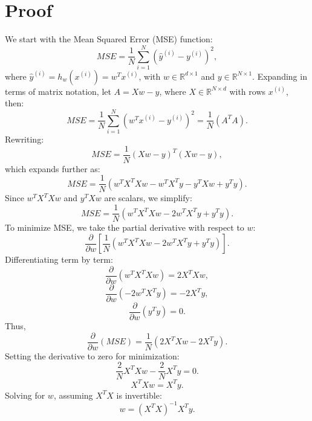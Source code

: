 \documentclass{article}
\begin{document}
\section*{Proof}
We start with the Mean Squared Error (MSE) function:
\begin{equation}
    MSE = \frac{1}{N} \sum_{i=1}^{N} (\hat{y}^{(i)} - y^{(i)})^2,
\end{equation}
where \( \hat{y}^{(i)} = h_w(x^{(i)}) = w^T x^{(i)} \), with \( w \in \mathbb{R}^{d \times 1} \) and \( y \in \mathbb{R}^{N \times 1} \).
Expanding in terms of matrix notation, let \( A = Xw - y \), where \( X \in \mathbb{R}^{N \times d} \) with rows \( x^{(i)} \), then:
\begin{equation}
    MSE = \frac{1}{N} \sum_{i=1}^{N} (w^T x^{(i)} - y^{(i)})^2 = \frac{1}{N} (A^T A).
\end{equation}
Rewriting:
\begin{equation}
    MSE = \frac{1}{N} (Xw - y)^T (Xw - y),
\end{equation}
which expands further as:
\begin{equation}
    MSE = \frac{1}{N} \left( w^T X^T X w - w^T X^T y - y^T X w + y^T y \right).
\end{equation}
Since \( w^T X^T X w \) and \( y^T X w \) are scalars, we simplify:
\begin{equation}
    MSE = \frac{1}{N} \left( w^T X^T X w - 2 w^T X^T y + y^T y \right).
\end{equation}
To minimize MSE, we take the partial derivative with respect to \( w \):
\begin{equation}
    \frac{\partial}{\partial w} \left[ \frac{1}{N} \left( w^T X^T X w - 2 w^T X^T y + y^T y \right) \right].
\end{equation}
Differentiating term by term:
\begin{equation}
    \frac{\partial}{\partial w} (w^T X^T X w) = 2X^T X w,
\end{equation}
\begin{equation}
    \frac{\partial}{\partial w} (-2 w^T X^T y) = -2 X^T y,
\end{equation}
\begin{equation}
    \frac{\partial}{\partial w} (y^T y) = 0.
\end{equation}
Thus,
\begin{equation}
    \frac{\partial}{\partial w} (MSE) = \frac{1}{N} (2X^T X w - 2X^T y).
\end{equation}
Setting the derivative to zero for minimization:
\begin{equation}
    \frac{2}{N} X^T X w - \frac{2}{N} X^T y = 0.
\end{equation}
\begin{equation}
    X^T X w = X^T y.
\end{equation}
Solving for \( w \), assuming \( X^T X \) is invertible:
\begin{equation}
    w = (X^T X)^{-1} X^T y.
\end{equation}

\end{document}
